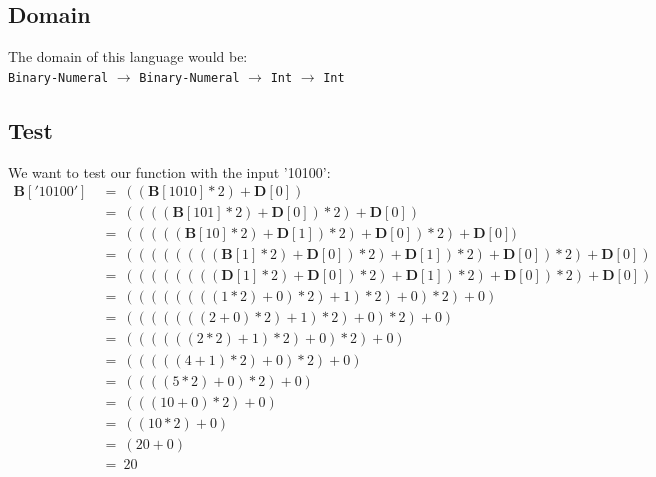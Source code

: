 \documentclass{report}
\begin{document}
		\subsection{Domain}
		\startsubsection
			The domain of this language would be: \\
			\texttt{Binary-Numeral} $\rightarrow$ \texttt{Binary-Numeral} $\rightarrow$ \texttt{Int} $\rightarrow$ \texttt{Int}
		\closesection
		\subsection{Test}
		\startsubsection
			We want to test our function with the input '10100':
			\begin{align*}
				\textbf{B}['10100'] \ & = \ ((\textbf{B}[1010]*2) + \textbf{D}[0]) \\
				& = \ ((((\textbf{B}[101]*2) + \textbf{D}[0])*2) + \textbf{D}[0]) \\
				& = \ (((((\textbf{B}[10]*2) + \textbf{D}[1])*2) + \textbf{D}[0])*2) + \textbf{D}[0]) \\
				& = \ ((((((((\textbf{B}[1]*2) + \textbf{D}[0])*2) + \textbf{D}[1])*2) + \textbf{D}[0])*2) + \textbf{D}[0]) \\
				& = \ ((((((((\textbf{D}[1]*2) + \textbf{D}[0])*2) + \textbf{D}[1])*2) + \textbf{D}[0])*2) + \textbf{D}[0]) \\
				& = \ ((((((((1*2) + 0)*2) + 1)*2) + 0)*2) + 0) \\
				& = \ (((((((2 + 0)*2) + 1)*2) + 0)*2) + 0) \\
				& = \ ((((((2*2) + 1)*2) + 0)*2) + 0) \\
				& = \ (((((4 + 1)*2) + 0)*2) + 0) \\
				& = \ ((((5*2) + 0)*2) + 0) \\
				& = \ (((10 + 0)*2) + 0) \\
				& = \ ((10*2) + 0) \\
				& = \ (20 + 0) \\
				& = \ 20
			\end{align*}
		\closesection
	\closesection
\end{document}
